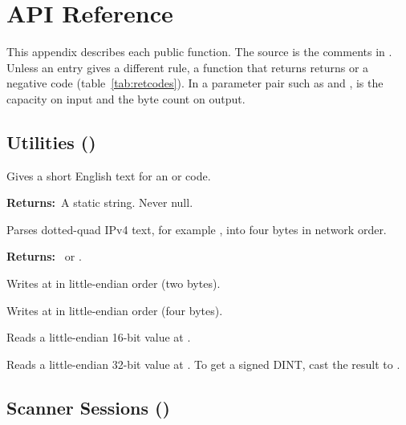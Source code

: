 \chapter{API Reference}\label{app:api}

This appendix describes each public function. The source is the comments in
. Unless an entry gives a different rule, a function that
returns  returns  or a negative  code
(table~\ref{tab:retcodes}). In a parameter pair such as  and
,  is the capacity on input and the byte count
on output.

\newcommand{\ret}{\par\noindent\textsf{\small\textbf{Returns:}}\ }
\newcommand{\thr}{\par\noindent\textsf{\small\textbf{Context:}}\ }

\section{Utilities ()}

Gives a short English text for an  or  code.
\ret A static string. Never null.

Parses dotted-quad IPv4 text, for example , into four
bytes in network order.
\ret {} or .

Writes  at  in little-endian order (two bytes).

Writes  at  in little-endian order (four bytes).

Reads a little-endian 16-bit value at .

Reads a little-endian 32-bit value at . To get a signed DINT, cast the
result to .

\section{Scanner Sessions ()}

